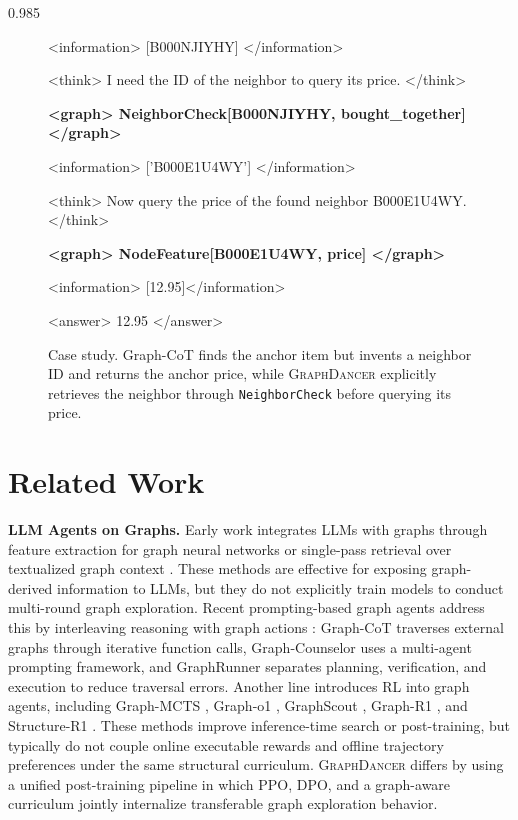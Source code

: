 \documentclass[11pt]{article}
\newcommand{\ours}{\textsc{GraphDancer}\xspace}
\begin{document}
\begin{spacing}{0.985}
\begin{figure}[t]
\begin{tcolorbox}[
    colback=teal!10!white,
    colframe=teal!40!white,
    title=,
    fonttitle=\small,
    coltitle=black,
    boxsep=0.75mm,
    left=1.5mm,
    right=1.5mm,
    top=1mm,
    bottom=1mm
    ]
{    <information> [B000NJIYHY] </information> \par
    <think> I need the ID of the neighbor to query its price. </think> \par
    {\color{teal} \textbf{<graph> NeighborCheck[B000NJIYHY, bought\_together] </graph>}} \par
    <information> ['B000E1U4WY'] </information> \par
    <think> Now query the price of the found neighbor B000E1U4WY. </think> \par
    {\color{teal} \textbf{<graph> NodeFeature[B000E1U4WY, price] </graph>}} \par
    <information> [12.95]</information> \par
    <answer> 12.95 </answer> 
    }
\end{tcolorbox}
\vspace{-0.5em}
\caption{Case study. Graph-CoT finds the anchor item but invents a neighbor ID and returns the anchor price, while \ours explicitly retrieves the neighbor through \texttt{NeighborCheck} before querying its price.}
\label{fig:case_study}
\vspace{-1.5em}
\end{figure}

\section{Related Work}
\noindent \textbf{LLM Agents on Graphs.}
Early work integrates LLMs with graphs through feature extraction for graph neural networks \citep{santoro2017simple,zhao2023learning,jin2023heterformer,duan2024simteg} or single-pass retrieval over textualized graph context \citep{gao2023retrieval,ye2024language}.
These methods are effective for exposing graph-derived information to LLMs, but they do not explicitly train models to conduct multi-round graph exploration.
Recent prompting-based graph agents address this by interleaving reasoning with graph actions \citep{luo2024reasoning,wang2024knowledge}: Graph-CoT \citep{jin2024graph} traverses external graphs through iterative function calls, Graph-Counselor \citep{gao2025graph} uses a multi-agent prompting framework, and GraphRunner \citep{kashmira2025graphrunner} separates planning, verification, and execution to reduce traversal errors.
Another line introduces RL into graph agents, including Graph-MCTS \citep{liu2025graphmcts}, Graph-o1 \citep{liu2025grapho1}, GraphScout \citep{ying2026graphscout}, Graph-R1 \citep{luo2025graph}, and Structure-R1 \citep{wu2025structure}.
These methods improve inference-time search or post-training, but typically do not couple online executable rewards and offline trajectory preferences under the same structural curriculum.
\ours differs by using a unified post-training pipeline in which PPO, DPO, and a graph-aware curriculum jointly internalize transferable graph exploration behavior.


\end{spacing}
\end{document}
